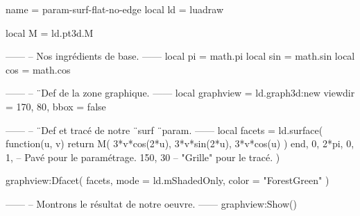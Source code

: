 \documentclass[border = 3pt]{standalone}
\begin{document}
\begin{luadraw*}{name = param-surf-flat-no-edge}
local ld = luadraw

local M = ld.pt3d.M

------
-- Nos ingrédients de base.
------
local pi  = math.pi
local sin = math.sin
local cos = math.cos

------
-- ¨Def de la zone graphique.
------
local graphview = ld.graph3d:new{
  viewdir = {170, 80},
  bbox    = false
}

------
-- ¨Def et tracé de notre ¨surf ¨param.
------
local facets = ld.surface(
  function(u, v)
    return M(
      3*v*cos(2*u),
      3*v*sin(2*u),
      3*v*cos(u)
    )
  end,
  0, 2*pi, 0, 1,  -- Pavé pour le paramétrage.
  {150, 30}       -- "Grille" pour le tracé.
)

graphview:Dfacet(
  facets,
  {
    mode  = ld.mShadedOnly,
    color = "ForestGreen"
  }
)

------
-- Montrons le résultat de notre oeuvre.
------
graphview:Show()
\end{luadraw*}
\end{document}
